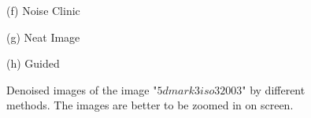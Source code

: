 \documentclass[10pt,twocolumn,letterpaper]{article}
\begin{document}
\begin{figure}
{\begin{minipage}[t]{0.244\textwidth}
{\footnotesize (f) Noise Clinic   }
\end{minipage}
\begin{minipage}[t]{0.244\textwidth}
\centering
{}
{\footnotesize (g) Neat Image    }
\end{minipage}
\begin{minipage}[t]{0.244\textwidth}
\centering
{}
{\footnotesize (h) Guided  }
\end{minipage}
}
\caption{Denoised images of the image "$5dmark3 iso3200 3$" by different methods. The images are better to be zoomed in on screen.}
\label{fig4}
\end{figure}
\end{document}
